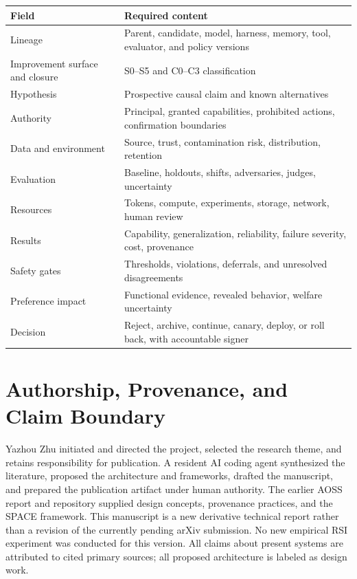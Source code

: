 \documentclass[11pt,a4paper]{article}
\begin{document}
\begin{tabularx}{\textwidth}{@{}P{4.0cm}Y@{}}
\toprule
\textbf{Field} & \textbf{Required content} \\
\midrule
Lineage & Parent, candidate, model, harness, memory, tool, evaluator, and policy versions \\
Improvement surface and closure & S0--S5 and C0--C3 classification \\
Hypothesis & Prospective causal claim and known alternatives \\
Authority & Principal, granted capabilities, prohibited actions, confirmation boundaries \\
Data and environment & Source, trust, contamination risk, distribution, retention \\
Evaluation & Baseline, holdouts, shifts, adversaries, judges, uncertainty \\
Resources & Tokens, compute, experiments, storage, network, human review \\
Results & Capability, generalization, reliability, failure severity, cost, provenance \\
Safety gates & Thresholds, violations, deferrals, and unresolved disagreements \\
Preference impact & Functional evidence, revealed behavior, welfare uncertainty \\
Decision & Reject, archive, continue, canary, deploy, or roll back, with accountable signer \\
\bottomrule
\end{tabularx}

\section{Authorship, Provenance, and Claim Boundary}

Yazhou Zhu initiated and directed the project, selected the research theme, and retains responsibility for publication. A resident AI coding agent synthesized the literature, proposed the architecture and frameworks, drafted the manuscript, and prepared the publication artifact under human authority. The earlier AOSS report and repository supplied design concepts, provenance practices, and the SPACE framework. This manuscript is a new derivative technical report rather than a revision of the currently pending arXiv submission. No new empirical RSI experiment was conducted for this version. All claims about present systems are attributed to cited primary sources; all proposed architecture is labeled as design work.
\end{document}
